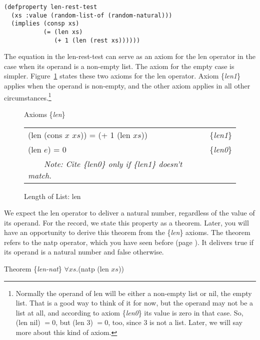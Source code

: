 \begin{Verbatim}
(defproperty len-rest-test
  (xs :value (random-list-of (random-natural)))
  (implies (consp xs)
           (= (len xs)
              (+ 1 (len (rest xs))))))
\end{Verbatim}

The equation in the len-rest-test can serve
as an axiom for the len operator in the case
when its operand is a non-empty list.
The axiom for the empty case is simpler.
Figure~\ref{fig:len-axioms} states these two axioms for
the len operator. Axiom \{\emph{len1}\} applies when
the operand is non-empty, and the other axiom
applies in all other circumstances.\footnote{Normally
the operand of len will be either a non-empty list or nil, the empty list.
That is a good way to think of it for now,  
but the operand may not be a list at all, 
and according to axiom \{\emph{len0}\} its value is zero in that case.
So, (len nil) $= 0$, but (len $3$) $= 0$, too, since
$3$ is not a list. Later, we will say more about this kind of axiom.}

\begin{figure}
\begin{center}
Axioms \{\emph{len}\} \\
\begin{tabular}{ll}
(len (cons $x$ $xs$)) = (+ 1 (len $xs$)) & \{\emph{len1}\} \\
(len $e$) = 0                            & \{\emph{len0}\} \\
~~~~\emph{Note: Cite \{\emph{len0}\} only if \{\emph{len1}\} doesn't match.}&\\
\end{tabular}
\end{center}
\caption{Length of List: len}
\label{len-equations}
\label{fig:len-axioms}
\end{figure}

We expect the len operator to deliver a natural number,
regardless of the value of its operand.
For the record, we state this property as a theorem.
Later, you will have an opportunity to derive
this theorem from the \{\emph{len}\} axioms.
The theorem refers to the natp operator,
which you have seen before (page \pageref{natp-op}).
It delivers true if its operand is a natural number and false otherwise.
\begin{samepage}
\label{len-nat-thm}
\begin{center}
Theorem \{\emph{len-nat}\} $\forall xs.$(natp (len $xs$))
\end{center}
\end{samepage}

